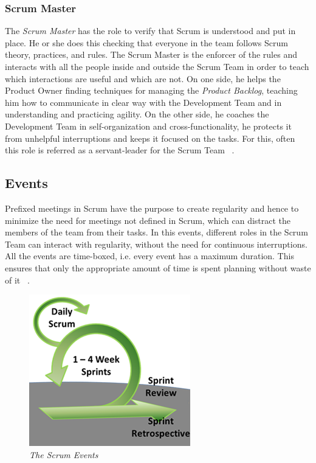			\subsubsection{Scrum Master}
			The \emph{Scrum Master} has the role to verify that Scrum is understood and put in place. He or she does this checking that everyone in the team follows Scrum theory, practices, and rules. 
			The Scrum Master is the enforcer of the rules and interacts with all the people inside and outside the Scrum Team in order to teach which interactions are useful and which are not.
			On one side, he helps the Product Owner finding techniques for managing the \emph{Product Backlog}, teaching him how to communicate in clear way with the Development Team and in understanding and practicing agility. On the other side, he coaches the Development Team in self-organization and cross-functionality, he protects it from unhelpful interruptions and keeps it focused on the tasks. 
			For this, often this role is referred as a servant-leader for the Scrum Team ~\cite{scrumEnglishGuide}.


		\subsection{Events}
			Prefixed meetings in Scrum have the purpose to create regularity and hence to minimize the need for meetings not defined in Scrum, which can distract the members of the team from their tasks. In this events, different roles in the Scrum Team can interact with regularity, without the need for continuous interruptions. All the events are time-boxed, i.e. every event has a maximum duration. This ensures that only the appropriate amount of time is spent planning without waste of it ~\cite{scrumEnglishGuide}.   

			\begin{figure}[h]
			  \begin{center} 
			    \includegraphics[scale=0.8]{images/ch_04/scrum_events.png}
			  \end{center} 
			  \caption{\textit{The Scrum Events}}  
			  \label{fig:ScrumEvents}
		  	\end{figure}
			


